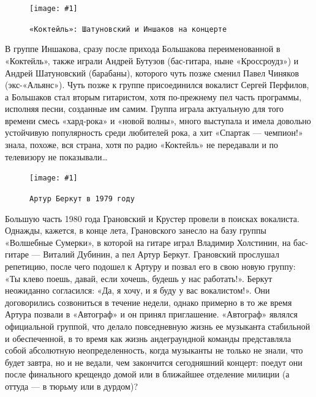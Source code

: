\documentclass[10pt, twoside]{book}
\newcommand{\myincludegraphics}[1]{\texttt{[image: \#1]}}
\begin{document}
\begin{figure}[h]
    \centering
    \myincludegraphics{Image06}
    \caption{\texttt{«Коктейль»: Шатуновский и Иншаков на концерте}}
\end{figure}

В группе Иншакова, сразу после прихода Большакова переименованной в «Коктейль», также играли Андрей Бутузов (бас-гитара,
ныне «Кроссроудз») и Андрей Шатуновский (барабаны), которого чуть позже сменил Павел Чиняков (экс-«Альянс»). Чуть позже
к группе присоединился вокалист Сергей Перфилов, а Большаков стал вторым гитаристом, хотя по-прежнему пел часть
программы, исполняя песни, созданные им самим. Группа играла актуальную для того времени смесь «хард-рока» и «новой
волны», много выступала и имела довольно устойчивую популярность среди любителей рока, а хит «Спартак — чемпион!» знала,
похоже, вся страна, хотя по радио «Коктейль» не передавали и по телевизору не показывали\ldots

\begin{figure}
    \centering
    \myincludegraphics{Image07}
    \caption{\texttt{Артур Беркут в 1979 году}}
\end{figure}

Большую часть 1980 года Грановский и Крустер провели в поисках вокалиста. Однажды, кажется, в конце лета, Грановского
занесло на базу группы «Волшебные Сумерки», в которой на гитаре играл Владимир Холстинин, на бас-гитаре — Виталий
Дубинин, а пел Артур Беркут. Грановский прослушал репетицию, после чего подошел к Артуру и позвал его в свою новую
группу: «Ты клево поешь, давай, если хочешь, будешь у нас работать!». Беркут неожиданно согласился: «Да, я хочу, и я
буду у вас вокалистом!». Они договорились созвониться в течение недели, однако примерно в то же время Артура позвали в
«Автограф» и он принял приглашение. «Автограф» являлся официальной группой, что делало повседневную жизнь ее музыканта
стабильной и обеспеченной, в то время как жизнь андеграундной команды представляла собой абсолютную неопределенность,
когда музыканты не только не знали, что будет завтра, но и не ведали, чем закончится сегодняшний концерт: поедут они
после финального крещендо домой или в ближайшее отделение милиции (а оттуда — в тюрьму или в дурдом)?
\end{document}

